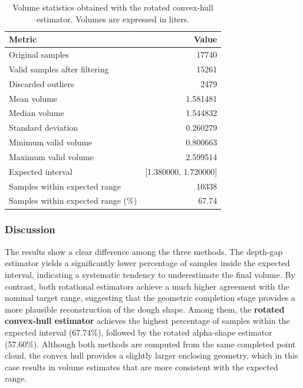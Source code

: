 \begin{table}[h]
    \centering
    \caption{Volume statistics obtained with the rotated convex-hull estimator. Volumes are expressed in liters.}
    \label{tab:volume_rotated_hull_stats}
    \begin{tabular}{|l|r|}
        \hline
        Metric & Value \\
        \hline
        Original samples & 17740 \\
        Valid samples after filtering & 15261 \\
        Discarded outliers & 2479 \\
        Mean volume & 1.581481 \\
        Median volume & 1.544832 \\
        Standard deviation & 0.260279 \\
        Minimum valid volume & 0.800663 \\
        Maximum valid volume & 2.599514 \\
        Expected interval & [1.380000, 1.720000] \\
        Samples within expected range & 10338 \\
        Samples within expected range (\%) & 67.74 \\
        \hline
    \end{tabular}
\end{table}

\subsubsection{Discussion}
The results show a clear difference among the three methods. The depth-gap estimator yields a significantly lower percentage of samples inside the expected interval, indicating a systematic tendency to underestimate the final volume. By contrast, both rotational estimators achieve a much higher agreement with the nominal target range, suggesting that the geometric completion stage provides a more plausible reconstruction of the dough shape. Among them, the \textbf{rotated convex-hull estimator} achieves the highest percentage of samples within the expected interval (67.74\%), followed by the rotated alpha-shape estimator (57.60\%). Although both methods are computed from the same completed point cloud, the convex hull provides a slightly larger enclosing geometry, which in this case results in volume estimates that are more consistent with the expected range.

